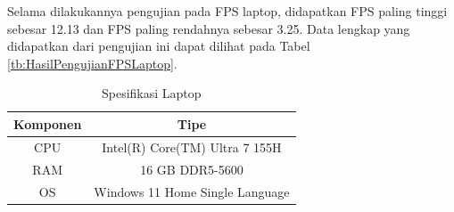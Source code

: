 Selama dilakukannya pengujian pada FPS laptop, didapatkan FPS paling tinggi sebesar 12.13 dan FPS paling rendahnya sebesar 3.25. Data lengkap yang didapatkan dari pengujian ini dapat dilihat pada Tabel \ref{tb:HasilPengujianFPSLaptop}.


\begin{longtable}{|c|c|}
  \caption{Spesifikasi Laptop}
  \label{tb:SpesifikasiLaptop}                                   \\
  \hline
  \rowcolor[HTML]{C0C0C0}
  \textbf{Komponen} & \textbf{Tipe} \\
  \hline
  CPU         & Intel(R) Core(TM) Ultra 7 155H              \\
  \hline
  RAM         & 16 GB DDR5-5600              \\
  \hline
  OS         & Windows 11 Home Single Language              \\
  \hline
\end{longtable}


